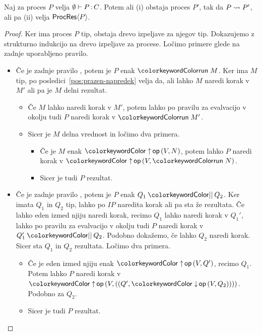 \begin{izrek}[o napredku]
	Naj za proces $P$ velja $\emptyset \vdash P \mathinner{:} C$. Potem ali (i) obstaja proces $P'$, tak da $P \leadsto P'$, ali pa (ii) velja $\mathsf{ProcRes}\langle P \rangle$.
\end{izrek}

\begin{proof}
	Ker ima proces $P$ tip, obstaja drevo izpeljave za njegov tip.
	Dokazujemo z strukturno indukcijo na drevo izpeljave za procese.
	Ločimo primere glede na zadnje uporabljeno pravilo.
	
	\begin{itemize}
		\item Če je zadnje pravilo , potem je $P$ enak $\tmrun{M}$. Ker ima $M$ tip, po posledici~\ref{pos:prazen-napredek} velja da, ali lahko $M$ naredi korak v $M'$ ali pa je $M$ delni rezultat.
		\begin{itemize}
			\item Če $M$ lahko naredi korak v $M'$, potem lahko po pravilu za evalvacijo v okolju tudi $P$ naredi korak v $\tmrun{M'}$.
			\item Sicer je $M$ delna vrednost in ločimo dva primera.
			\begin{itemize}
				\item Če je $M$ enak $\tmopout{op}{V}{N}$, potem lahko $P$ naredi korak v $\tmopout{op}{V}{\tmrun{N}}$.
				\item Sicer je tudi $P$ rezultat.
			\end{itemize}
		\end{itemize}
		
		\item Če je zadnje pravilo , potem je $P$ enak $\tmpar{Q_1}{Q_2}$. Ker imata $Q_1$ in $Q_2$ tip, lahko po $IP$ naredita korak ali pa sta že rezultata.
		Če lahko eden izmed njiju naredi korak, recimo $Q_1$ lahko naredi korak v $Q_1'$, lahko po pravilu za evalvacijo v okolju tudi $P$ naredi korak v $\tmpar{Q_1'}{Q_2}$. Podobno dokažemo, če lahko $Q_2$ naredi korak.
		Sicer sta $Q_1$ in $Q_2$ rezultata. Ločimo dva primera.
		\begin{itemize}
			\item Če je eden izmed njiju enak $\tmopout{op}{V}{Q'}$, recimo $Q_1$. Potem lahko $P$ naredi korak v $\tmopout{op}{V}{(\tmpair{Q'}{\tmopin{op}{V}{Q_2}})}$. Podobno za $Q_2$.
			\item Sicer je tudi $P$ rezultat.
		\end{itemize}
		

\end{itemize}
\end{proof}
